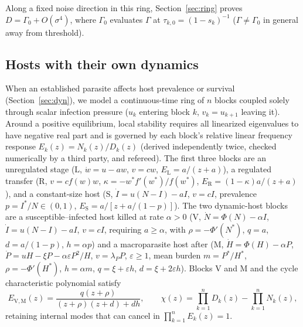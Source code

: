 Along a fixed noise direction in this ring, Section~\ref{sec:ring} proves $D = \Gamma_0 + O(\sigma^4)$, where $\Gamma_0$ evaluates $\Gamma$ at $\tau_{k,0} = (1 - s_k)^{-1}$ ($\Gamma \ne \Gamma_0$ in general away from threshold).

\subsection{Hosts with their own dynamics}\label{sec:model-dyn}

When an established parasite affects host prevalence or survival (Section~\ref{sec:dyn}), we model a continuous-time ring of $n$ blocks coupled solely through scalar infection pressure ($u_k$ entering block $k$, $v_k = u_{k+1}$ leaving it). Around a positive equilibrium, local stability requires all linearized eigenvalues to have negative real part and is governed by each block's relative linear frequency response $E_k(z) = N_k(z)/D_k(z)$ (derived independently twice, checked numerically by a third party, and refereed). The first three blocks are an unregulated stage ($\mathrm{L}$, $\dot{w} = u - a w$, $v = c w$, $E_{\mathrm{L}} = a/(z + a)$), a regulated transfer ($\mathrm{R}$, $v = c f(w) w$, $\kappa = -w^* f'(w^*)/f(w^*)$, $E_{\mathrm{R}} = (1 - \kappa)a/(z + a)$), and a constant-size host ($\mathrm{S}$, $\dot{I} = u(N - I) - a I$, $v = c I$, prevalence $p = I^*/N \in (0, 1)$, $E_{\mathrm{S}} = a/[z + a/(1 - p)]$). The two dynamic-host blocks are a susceptible--infected host killed at rate $\alpha > 0$ ($\mathrm{V}$, $\dot{N} = \Phi(N) - \alpha I$, $\dot{I} = u(N - I) - a I$, $v = c I$, requiring $a \ge \alpha$, with $\rho = -\Phi'(N^*)$, $q = a$, $d = a/(1 - p)$, $h = \alpha p$) and a macroparasite host after \citet{anderson1978} ($\mathrm{M}$, $\dot{H} = \Phi(H) - \alpha P$, $\dot{P} = u H - \xi P - \alpha \varepsilon P^2/H$, $v = \lambda_P P$, $\varepsilon \ge 1$, mean burden $m = P^*/H^*$, $\rho = -\Phi'(H^*)$, $h = \alpha m$, $q = \xi + \varepsilon h$, $d = \xi + 2\varepsilon h$). Blocks $\mathrm{V}$ and $\mathrm{M}$ and the cycle characteristic polynomial satisfy
\begin{equation}\label{eq:model-blocks}
E_{\mathrm{V,M}}(z) = \frac{q(z + \rho)}{(z + \rho)(z + d) + d h}, \qquad \chi(z) = \prod_{k=1}^n D_k(z) - \prod_{k=1}^n N_k(z),
\end{equation}
retaining internal modes that can cancel in $\prod_{k=1}^n E_k(z) = 1$.

